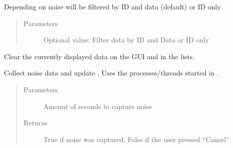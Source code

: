 \documentclass[letterpaper,10pt,english]{sphinxmanual}
\begin{document}
\begin{fulllineitems}
\begin{fulllineitems}
Depending on  noise will be filtered by
ID and data (default) or ID only
\begin{quote}\begin{description}
\item[{Parameters}] \leavevmode
{} \textendash{} Optional value: Filter data by ID and Data or ID only

\end{description}\end{quote}

\end{fulllineitems}


\begin{fulllineitems}
\label{\detokenize{src:src.FilterTab.FilterTab.clear}}
Clear the currently displayed data on the GUI and in the lists.

\end{fulllineitems}


\begin{fulllineitems}
\label{\detokenize{src:src.FilterTab.FilterTab.collectNoise}}
Collect noise data and update .
Uses the processes/threads started in {\hyperref[\detokenize{src:src.FilterTab.FilterTab.startSnifferAndAdder}]{}}.
\begin{quote}\begin{description}
\item[{Parameters}] \leavevmode
{} \textendash{} Amount of seconds to capture noise

\item[{Returns}] \leavevmode
True if noise was captured. False if the user pressed “Cancel”

\end{description}\end{quote}

\end{fulllineitems}



\end{fulllineitems}
\end{document}
